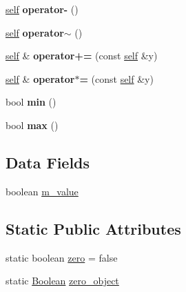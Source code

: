\begin{DoxyCompactItemize}
\hyperlink{classez_1_1objects_1_1Boolean}{self} {\bfseries operator-\/} ()
\item 
\mbox{\label{classez_1_1objects_1_1Boolean_afcffd74fa28f53e2668ca7b7a1a862df}} 
\hyperlink{classez_1_1objects_1_1Boolean}{self} {\bfseries operator$\sim$} ()
\item 
\mbox{\label{classez_1_1objects_1_1Boolean_a22ce5ecbc0b5bd2109d415f240db9b05}} 
\hyperlink{classez_1_1objects_1_1Boolean}{self} \& {\bfseries operator+=} (const \hyperlink{classez_1_1objects_1_1Boolean}{self} \&y)
\item 
\mbox{\label{classez_1_1objects_1_1Boolean_a474e9cf9c243edca2e8a801163626ec1}} 
\hyperlink{classez_1_1objects_1_1Boolean}{self} \& {\bfseries operator$\ast$=} (const \hyperlink{classez_1_1objects_1_1Boolean}{self} \&y)
\item 
\mbox{\label{classez_1_1objects_1_1Boolean_a6a5ec24705da1c4094397e7b76d34744}} 
bool {\bfseries min} ()
\item 
\mbox{\label{classez_1_1objects_1_1Boolean_ad118af05489aa8cc511b1dc8d39f4257}} 
bool {\bfseries max} ()
\end{DoxyCompactItemize}
\subsection*{Data Fields}
\begin{DoxyCompactItemize}
\item 
boolean \hyperlink{classez_1_1objects_1_1Boolean_a535d669406c4dae958e2ce00b2a339d3}{m\+\_\+value}
\end{DoxyCompactItemize}
\subsection*{Static Public Attributes}
\begin{DoxyCompactItemize}
\item 
static boolean \hyperlink{classez_1_1objects_1_1Boolean_aeb78b2275c789e764ceebe3bb7e86945}{zero} = false
\item 
static \hyperlink{classez_1_1objects_1_1Boolean}{Boolean} \hyperlink{classez_1_1objects_1_1Boolean_ab42b94b5b5ddc33cd64501447fdaa33c}{zero\+\_\+object}
\end{DoxyCompactItemize}
